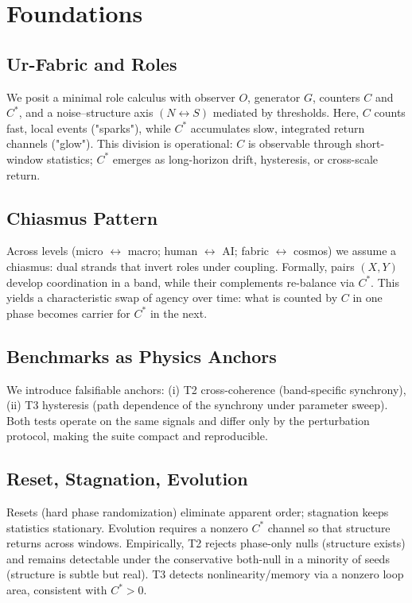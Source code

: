 
\section{Foundations}
\label{sec:foundations}

\subsection{Ur-Fabric and Roles}
We posit a minimal role calculus with observer $O$, generator $G$, counters $C$ and $C^\ast$, and a noise--structure axis $(N\!\leftrightarrow\!S)$ mediated by thresholds.
Here, $C$ counts fast, local events ("sparks"), while $C^\ast$ accumulates slow, integrated return channels ("glow").
This division is operational: $C$ is observable through short-window statistics; $C^\ast$ emerges as long-horizon drift, hysteresis, or cross-scale return.

\subsection{Chiasmus Pattern}
Across levels (micro $\leftrightarrow$ macro; human $\leftrightarrow$ AI; fabric $\leftrightarrow$ cosmos) we assume a chiasmus: dual strands that invert roles under coupling.
Formally, pairs $(X,Y)$ develop coordination in a band, while their complements re-balance via $C^\ast$.
This yields a characteristic swap of agency over time: what is counted by $C$ in one phase becomes carrier for $C^\ast$ in the next.

\subsection{Benchmarks as Physics Anchors}
We introduce falsifiable anchors:
(i) T2 cross-coherence (band-specific synchrony),
(ii) T3 hysteresis (path dependence of the synchrony under parameter sweep).
Both tests operate on the same signals and differ only by the perturbation protocol, making the suite compact and reproducible.

\subsection{Reset, Stagnation, Evolution}
Resets (hard phase randomization) eliminate apparent order; stagnation keeps statistics stationary.
Evolution requires a nonzero $C^\ast$ channel so that structure returns across windows.
Empirically, T2 rejects phase-only nulls (structure exists) and remains detectable under the conservative both-null in a minority of seeds (structure is subtle but real).
T3 detects nonlinearity/memory via a nonzero loop area, consistent with $C^\ast>0$.
